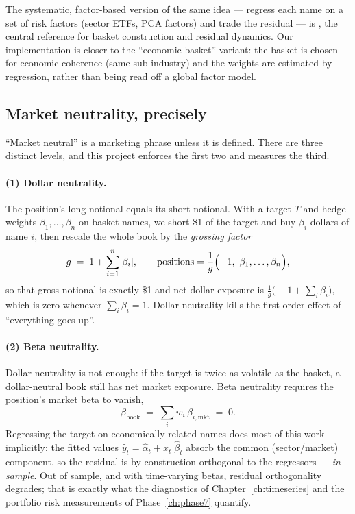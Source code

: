 The systematic, factor-based version of the same idea --- regress each name on a set of
risk factors (sector ETFs, PCA factors) and trade the residual --- is
\cite{avellaneda2010statistical}, the central reference for basket construction and
residual dynamics. Our implementation is closer to the ``economic basket'' variant: the
basket is chosen for economic coherence (same sub-industry) and the weights are
estimated by regression, rather than being read off a global factor model.

\subsection{Market neutrality, precisely}
\label{sec:saa:neutrality}

``Market neutral'' is a marketing phrase unless it is defined. There are three distinct
levels, and this project enforces the first two and measures the third.

\paragraph{(1) Dollar neutrality.} The position's long notional equals its short
notional. With a target $T$ and hedge weights $\beta_1,\dots,\beta_n$ on basket names,
we short \$1 of the target and buy $\beta_i$ dollars of name $i$, then rescale the
whole book by the \emph{grossing factor}
\begin{equation}
  g \;=\; 1 + \sum_{i=1}^{n}\lvert \beta_i\rvert ,
  \qquad
  \text{positions} = \frac{1}{g}\Bigl(-1,\ \beta_1,\dots,\beta_n\Bigr),
  \label{eq:grossing}
\end{equation}
so that gross notional is exactly \$1 and net dollar exposure is
$\tfrac{1}{g}\bigl(-1+\sum_i\beta_i\bigr)$, which is zero whenever $\sum_i\beta_i=1$.
Dollar neutrality kills the first-order effect of ``everything goes up''.

\paragraph{(2) Beta neutrality.} Dollar neutrality is not enough: if the target is
twice as volatile as the basket, a dollar-neutral book still has net market exposure.
Beta neutrality requires the position's market beta to vanish,
\begin{equation}
  \beta_{\text{book}} \;=\; \sum_{i} w_i\,\beta_{i,\text{mkt}} \;=\; 0 .
  \label{eq:betaneutral}
\end{equation}
Regressing the target on economically related names does most of this work implicitly:
the fitted values $\hat y_t = \hat\alpha_t + x_t^{\top}\hat\beta_t$ absorb the common
(sector/market) component, so the residual is by construction orthogonal to the
regressors --- \emph{in sample}. Out of sample, and with time-varying betas, residual
orthogonality degrades; that is exactly what the diagnostics of
Chapter~\ref{ch:timeseries} and the portfolio risk measurements of
Phase~\ref{ch:phase7} quantify.

